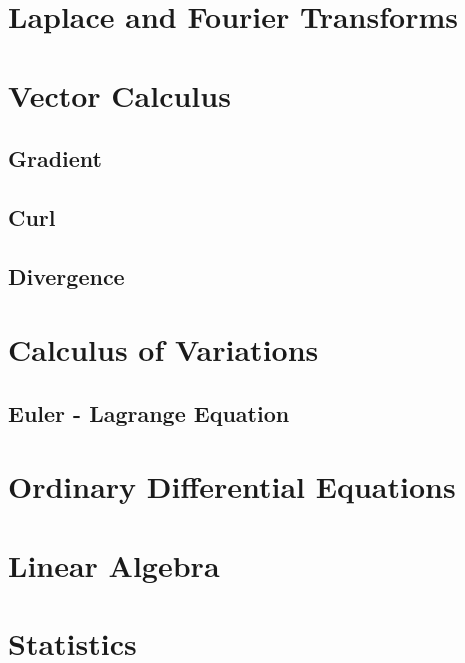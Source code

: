 \documentclass[12pt]{article}
\begin{document}
\section{Laplace and Fourier Transforms}
\section{Vector Calculus}
\subsection{Gradient}
\subsection{Curl}
\subsection{Divergence}
\section{Calculus of Variations}
\subsection{Euler - Lagrange Equation}
\section{Ordinary Differential Equations}
\section{Linear Algebra}
\section{Statistics}
\end{document}
